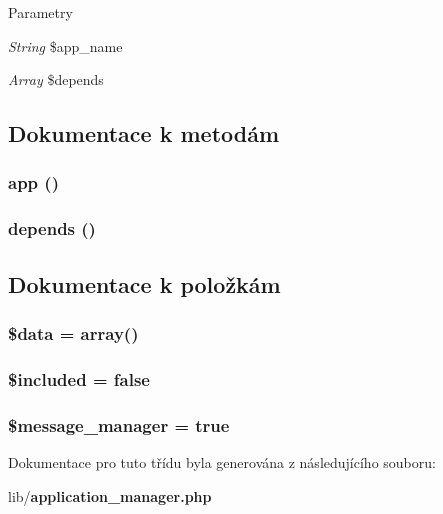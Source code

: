 \begin{DoxyParams}{Parametry}
\item[{\em String}]\$app\_\-name \item[{\em Array}]\$depends \end{DoxyParams}


\subsection{Dokumentace k metodám}
\subsubsection[{app}]{\setlength{\rightskip}{0pt plus 5cm}app ()}\label{de/d6b/class_application_a0b328204f1494443b4573c43d2bab29e}
\subsubsection[{depends}]{\setlength{\rightskip}{0pt plus 5cm}depends ()}\label{de/d6b/class_application_a2b1b71da3eb2fe72d51da4e9309152ad}


\subsection{Dokumentace k položkám}
\subsubsection[{\$data}]{\setlength{\rightskip}{0pt plus 5cm}\$data = array()\hspace{0.3cm}{\ttfamily  [private]}}\label{de/d6b/class_application_a6efc15b5a2314dd4b5aaa556a375c6d6}
\subsubsection[{\$included}]{\setlength{\rightskip}{0pt plus 5cm}\$included = false}\label{de/d6b/class_application_afc44ef0981a4c72dfc03aba296639cb4}
\subsubsection[{\$message\_\-manager}]{\setlength{\rightskip}{0pt plus 5cm}\$message\_\-manager = true\hspace{0.3cm}{\ttfamily  [private]}}\label{de/d6b/class_application_aa44c648f779d9cbac2bc0d623d0873c7}


Dokumentace pro tuto třídu byla generována z následujícího souboru:\begin{DoxyCompactItemize}
\item 
lib/{\bf application\_\-manager.php}\end{DoxyCompactItemize}
